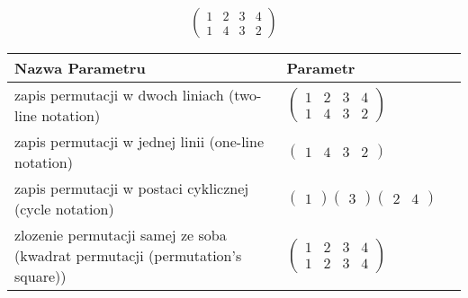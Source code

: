 \documentclass[12pt]{article}
\begin{document}
\subsection{}
\begin{center}
\[
\begin{pmatrix}
	1 & 2 & 3 & 4 \\ 
	1 & 4 & 3 & 2 
\end{pmatrix}
\]

\begin{tabular}{|m{0.6\linewidth}|m{0.4\linewidth}|}
	\hline
	Nazwa Parametru & Parametr \\
	\hline
	zapis permutacji w dwoch liniach (two-line notation) & $\begin{pmatrix} 1 & 2 & 3 & 4 \\ 
1 & 4 & 3 & 2 \end{pmatrix}$ \\ 
	\hline
	zapis permutacji w jednej linii (one-line notation) & $\begin{pmatrix} 1 & 4 & 3 & 2 \end{pmatrix}$ \\ 
	\hline
	zapis permutacji w postaci cyklicznej (cycle notation) & $\begin{pmatrix} 1 \end{pmatrix} \begin{pmatrix} 3 \end{pmatrix} \begin{pmatrix} 2 & 4 \end{pmatrix} $ \\ 
	\hline
	zlozenie permutacji samej ze soba (kwadrat permutacji (permutation's square)) & $\begin{pmatrix} 1 & 2 & 3 & 4 \\ 
1 & 2 & 3 & 4 \end{pmatrix}$ \\ 
	\hline
\end{tabular}
\end{center}
\end{document}
